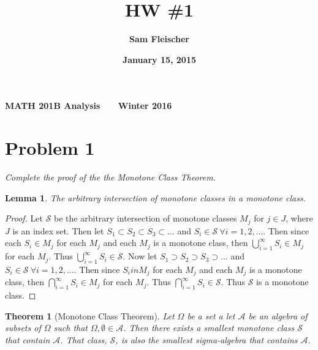 \documentclass[12pt]{article}
\title{\bf HW \#1}
\author{\bf Sam Fleischer}
\date{\bf January 15, 2015}
\theoremstyle{plain}
\newtheorem{theorem}{Theorem}
\newtheorem{lemma}{Lemma}
\begin{document}
\textbf{MATH 201B \hfill Analysis \ \ \ \hfill Winter 2016\ \ \ }

{\let\newpage\relax\maketitle}

\section*{Problem 1}
\textit{Complete the proof of the the Monotone Class Theorem.}

\begin{lemma}
    \label{monotone_class_lemma}
    The arbitrary intersection of monotone classes in a monotone class.
\end{lemma}
\begin{proof}
    Let $\mathcal{S}$ be the arbitrary intersection of monotone classes $M_j$ for $j \in J$, where $J$ is an index set.  Then let $S_1 \subset S_2 \subset S_3 \subset \dots$ and $S_i \in \mathcal{S}\ \forall i = 1, 2, \dots$.  Then since each $S_i \in M_j$ for each $M_j$ and each $M_j$ is a monotone class, then $\bigcup_{i=1}^\infty S_i \in M_j$ for each $M_j$.  Thus $\bigcup_{i=1}^\infty S_i \in \mathcal{S}$.  Now let $S_1 \supset S_2 \supset S_3 \supset \dots$ and $S_i \in \mathcal{S}\ \forall i = 1, 2, \dots$.  Then since $S_i in M_j$ for each $M_j$ and each $M_j$ is a monotone class, then $\bigcap_{i=1}^\infty S_i \in M_j$ for each $M_j$.  Thus $\bigcap_{i=1}^\infty S_i \in \mathcal{S}$.  Thus $\mathcal{S}$ is a monotone class.
\end{proof}

\begin{theorem}[Monotone Class Theorem]
    Let $\Omega$ be a set a let $\mathcal{A}$ be an algebra of subsets of $\Omega$ such that $\Omega, \emptyset \in \mathcal{A}$.  Then there exists a smallest monotone class $\mathcal{S}$ that contain $\mathcal{A}$.  That class, $\mathcal{S}$, is also the smallest sigma-algebra that contains $\mathcal{A}$.
\end{theorem}
\end{document}
